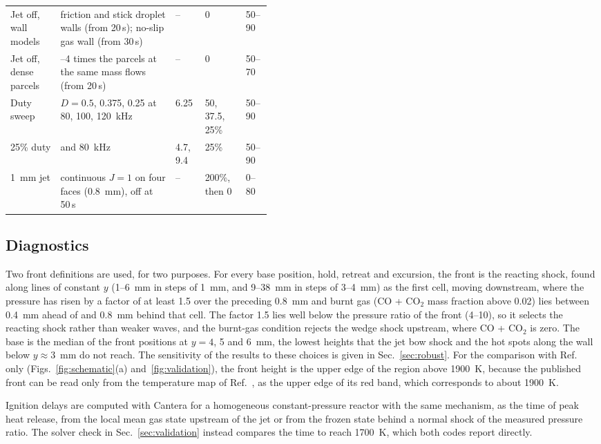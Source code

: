 \documentclass[aip,pof,preprint,amsmath,amssymb]{revtex4-2}
\newcommand{\us}{\,\textmu s}
\begin{document}
\begin{table}
\begin{tabular}{@{}l>{\raggedright\arraybackslash}p{0.44\linewidth}lll@{}}
Jet off, wall models & friction and stick droplet walls (from 20\us); no-slip gas wall (from 30\us) & -- & 0 & 50--90\\
Jet off, dense parcels & 3--4 times the parcels at the same mass flows (from 20\us) & -- & 0 & 50--70\\
Duty sweep & $D = 0.5$, 0.375, 0.25 at 80, 100, 120~kHz & 6.25 & 50, 37.5, 25\% & 50--90\\
25\% duty & 160 and 80~kHz & 4.7, 9.4 & 25\% & 50--90\\
1~mm jet & continuous $J = 1$ on four faces (0.8~mm), off at 50\us & -- & 200\%, then 0 & 0--80\\
\bottomrule
\end{tabular}
\end{table}

\subsection{Diagnostics}\label{sec:diagnostics}

Two front definitions are used, for two purposes. For every base position, hold, retreat and excursion, the front is the reacting shock, found along lines of constant $y$ (1--6~mm in steps of 1~mm, and 9--38~mm in steps of 3--4~mm) as the first cell, moving downstream, where the pressure has risen by a factor of at least 1.5 over the preceding 0.8~mm and burnt gas (CO + CO$_2$ mass fraction above 0.02) lies between 0.4~mm ahead of and 0.8~mm behind that cell. The factor 1.5 lies well below the pressure ratio of the front (4--10), so it selects the reacting shock rather than weaker waves, and the burnt-gas condition rejects the wedge shock upstream, where CO + CO$_2$ is zero. The base is the median of the front positions at $y = 4$, 5 and 6~mm, the lowest heights that the jet bow shock and the hot spots along the wall below $y \approx 3$~mm do not reach. The sensitivity of the results to these choices is given in Sec.~\ref{sec:robust}. For the comparison with Ref.~ only (Figs.~\ref{fig:schematic}(a) and~\ref{fig:validation}), the front height is the upper edge of the region above 1900~K, because the published front can be read only from the temperature map of Ref.~, as the upper edge of its red band, which corresponds to about 1900~K.

Ignition delays are computed with Cantera \cite{Cantera} for a homogeneous constant-pressure reactor with the same mechanism, as the time of peak heat release, from the local mean gas state upstream of the jet or from the frozen state behind a normal shock of the measured pressure ratio. The solver check in Sec.~\ref{sec:validation} instead compares the time to reach 1700~K, which both codes report directly.
\end{document}

